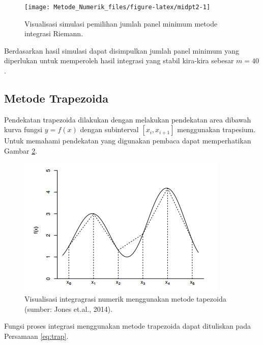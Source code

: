 \documentclass[
]{book}
\theoremstyle{definition}
\theoremstyle{definition}
\theoremstyle{definition}
\theoremstyle{definition}
\theoremstyle{remark}
\begin{document}
\begin{figure}

{\centering \texttt{[image: Metode\_Numerik\_files/figure-latex/midpt2-1]} 

}

\caption{Visualisasi simulasi pemilihan jumlah panel minimum metode integrasi Riemann.}\label{fig:midpt2}
\end{figure}

Berdasarkan hasil simulasi dapat disimpulkan jumlah panel minimum yang diperlukan untuk memperoleh hasil integrasi yang stabil kira-kira sebesar \(m=40\).

\hypertarget{trapezoida}{%
\subsection{Metode Trapezoida}\label{trapezoida}}

Pendekatan trapezoida dilakukan dengan melakukan pendekatan area dibawah kurva fungsi \(y=f\left(x\right)\) dengan subinterval \(\left[x_i,x_{i+1}\right]\) menggunakan trapesium. Untuk memahami pendekatan yang digunakan pembaca dapat memperhatikan Gambar \ref{fig:trapviz}.

\begin{figure}

{\centering \includegraphics[width=0.9\linewidth]{./images/trapviz} 

}

\caption{Visualisasi integragrasi numerik menggunakan metode tapezoida (sumber: Jones et.al., 2014).}\label{fig:trapviz}
\end{figure}

Fungsi proses integrasi menggunakan metode trapezoida dapat dituliskan pada Persamaan \eqref{eq:trap}.
\end{document}
